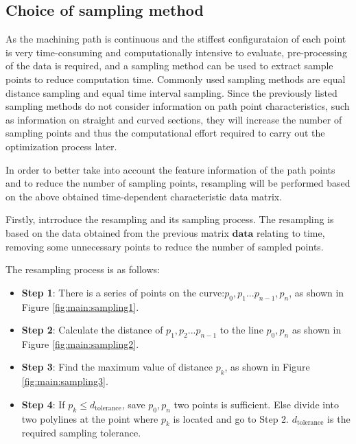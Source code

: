 \subsection{Choice of sampling method}\label{subsec:sec:Main:Pre-processing：sampling method}
As the machining path is continuous and the stiffest configurataion of each point is very time-consuming and computationally intensive to evaluate, pre-processing of the data is required, and a sampling method can be used to extract sample points to reduce computation time. Commonly used sampling methods are equal distance sampling and equal time interval sampling. Since the previously listed sampling methods do not consider information on path point characteristics, such as information on straight and curved sections, they will increase the number of sampling points and thus the computational effort required to carry out the optimization process later. \par
In order to better take into account the feature information of the path points and to reduce the number of sampling points, resampling will be performed based on the above obtained time-dependent characteristic data matrix. \par
Firstly, intrroduce the resampling and its sampling process. The resampling is based on the data obtained from the previous matrix $\boldsymbol{data}$ relating to time, removing some unnecessary points to reduce the number of sampled points. \par
The resampling process is as follows:
\begin{itemize}
 \item \textbf{Step 1}: There is a series of points on the curve:$p_{0},p_{1}...p_{n-1},p_{n}$, as shown in
Figure \ref{fig:main:sampling1}.
\item \textbf{Step 2}: Calculate the distance of $p_{1},p_{2}...p_{n-1}$ to the line $p_{0},p_{n}$ as shown in
Figure \ref{fig:main:sampling2}.
\item \textbf{Step 3}: Find the maximum value of distance $p_{k}$, as shown in
Figure \ref{fig:main:sampling3}.
\item \textbf{Step 4}: If $p_{k}\leq d_\mathrm{tolerance}$, save $p_{0},p_{n}$ two points is sufficient. Else divide into two polylines at the point where $p_{k}$ is located and go to Step 2. $d_\mathrm{tolerance}$ is the required sampling tolerance.
\end{itemize}
